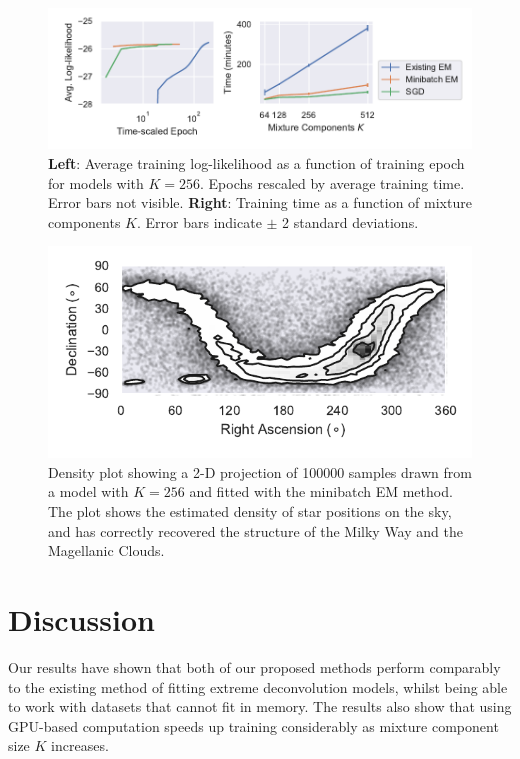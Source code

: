 \documentclass{article}
\begin{document}
\begin{figure}
  \centering
  \includegraphics[width=\textwidth]{figures/learning.pdf}
  \caption{\textbf{Left}: Average training log-likelihood as a function of training epoch for models with $K=256$. Epochs rescaled by average training time. Error bars not visible. \textbf{Right}: Training time as a function of mixture components $K$. Error bars indicate $\pm$ 2 standard deviations.}
  \label{fig:training}
\end{figure}

\begin{figure}
  \centering
  \includegraphics{figures/density.pdf}
  \caption{Density plot showing a 2-D projection of 100000 samples drawn from a model with $K=256$ and fitted with the minibatch EM method.
  The plot shows the estimated density of star positions on the sky, and has correctly recovered the structure of the Milky Way and the Magellanic Clouds.}
  \label{fig:projection}
\end{figure}

\section{Discussion}

Our results have shown that both of our proposed methods perform comparably to the existing method of fitting extreme deconvolution models, whilst being able to work with datasets that cannot fit in memory.
The results also show that using GPU-based computation speeds up training considerably as mixture component size $K$ increases.
\end{document}
